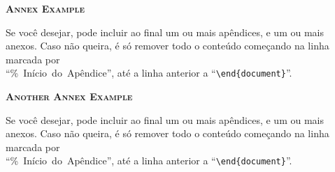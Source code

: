 \documentclass[a4paper, 12pt]{ppgeb}
\begin{document}
\clearpage
\begin{flushright}
\end{flushright}

\noindent\begin{large}{\bfseries\scshape Annex Example}\end{large} \label{sec:annex1}

\vspace{24pt}

Se você desejar, pode incluir ao final um ou mais apêndices, e um ou mais anexos. Caso não queira, é só remover todo o conteúdo começando na linha marcada por \\``\%~Início~do~Apêndice'', até a linha anterior a ``\verb|\end{document}|''.

\clearpage
\begin{flushright}
\end{flushright}

\noindent\begin{large}{\bfseries\scshape Another Annex Example}\end{large} \label{sec:annex2}

\vspace{24pt}

Se você desejar, pode incluir ao final um ou mais apêndices, e um ou mais anexos. Caso não queira, é só remover todo o conteúdo começando na linha marcada por \\``\%~Início~do~Apêndice'', até a linha anterior a ``\verb|\end{document}|''.
\end{document}
